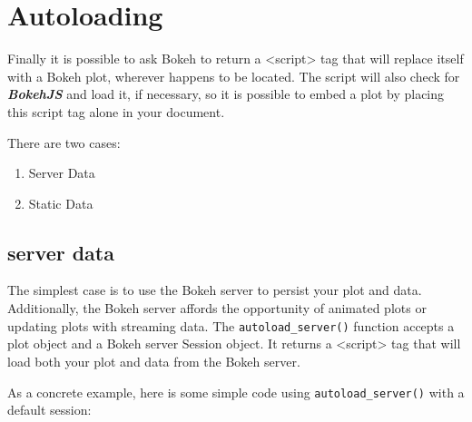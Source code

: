 
\section{Autoloading}
Finally it is possible to ask Bokeh to return a <script> tag that will replace itself with a Bokeh plot, wherever happens to be located. The script will also check for \textbf{\textit{BokehJS}} and load it, if necessary, so it is possible to embed a plot by placing this script tag alone in your document.

There are two cases:

\begin{enumerate}
\item Server Data
\item Static Data
\end{enumerate}
\subsection{server data}
The simplest case is to use the Bokeh server to persist your plot and data. Additionally, the Bokeh server affords the opportunity of animated plots or updating plots with streaming data. The \texttt{autoload\_server()} function accepts a plot object and a Bokeh server Session object. It returns a <script> tag that will load both your plot and data from the Bokeh server.

As a concrete example, here is some simple code using \texttt{autoload\_server()} with a default session:


